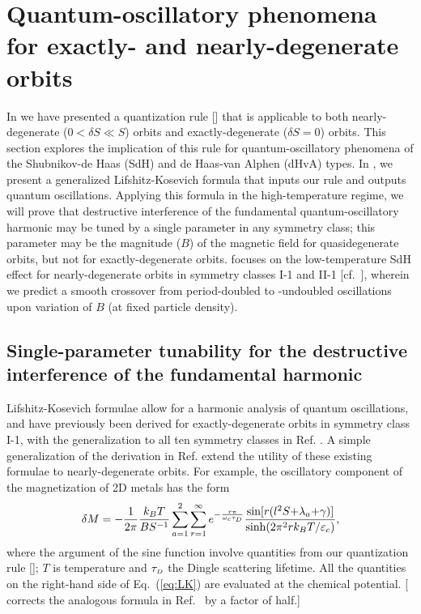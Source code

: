 \documentclass[aps, showpacs, twocolumn, notitlepage, superscriptaddress]{revtex4-1}
\begin{document}
\section{Quantum-oscillatory phenomena for exactly- and nearly-degenerate orbits}\label{sec:qo}

In  we have presented a quantization rule [] that is applicable to both nearly-degenerate ($0{<}\delta S{\ll}S$) orbits and exactly-degenerate ($\delta S{=}0$) orbits. This section explores the implication of this rule for quantum-oscillatory phenomena of the Shubnikov-de Haas (SdH)\cite{SdH} and de Haas-van Alphen (dHvA)\cite{dHvA} types. In , we present a generalized Lifshitz-Kosevich formula\cite{lifshitz_kosevich,lifshitz_kosevich_jetp} that inputs our rule and outputs quantum oscillations. Applying this formula in the high-temperature regime, we will prove that  destructive interference of the fundamental quantum-oscillatory harmonic may  be tuned by a single parameter in any symmetry class; this parameter may be the magnitude ($B$) of the magnetic field for quasidegenerate orbits, but not for exactly-degenerate orbits.  focuses on the low-temperature SdH effect for nearly-degenerate orbits in symmetry classes I-1 and II-1 [cf.\ ], wherein we predict a smooth crossover from period-doubled to -undoubled oscillations upon variation of $B$ (at fixed particle density).

\subsection{Single-parameter tunability for the destructive interference of the fundamental harmonic}\label{sec:quantosc_equidis}

Lifshitz-Kosevich formulae\cite{lifshitz_kosevich,lifshitz_kosevich_jetp} allow for a harmonic analysis of quantum oscillations, and have previously been derived for  exactly-degenerate orbits in symmetry class I-1\cite{rothmag}, with the generalization to all ten symmetry classes in Ref. . A simple generalization of the derivation in Ref.  extend the utility of these existing formulae to nearly-degenerate orbits. For example, the oscillatory component of the magnetization of 2D metals has the form
\begin{equation}
\delta M=-\frac{1}{2\pi}\frac{k_BT}{BS^{-1}}\sum_{a=1}^2\sum_{r=1}^{\infty}e^{-\frac{r\pi}{\omega_c\tau_{\scriptscriptstyle{D}}}} \frac{\text{sin}[r(l^2S{+}\lambda_a{+}\gamma)]}{\text{sinh}(2\pi^2rk_BT/\varepsilon_c)},\label{eq:LK}
\end{equation}
where the argument of the sine function involve quantities from our quantization rule []; $T$ is temperature and $\tau_{\scriptscriptstyle{D}}$  the Dingle scattering lifetime\cite{Dingle_collisions}. All the quantities on the right-hand side of Eq.\ (\ref{eq:LK}) are evaluated at the chemical potential. [ corrects the analogous formula in Ref.\  by a factor of half.]
\end{document}

